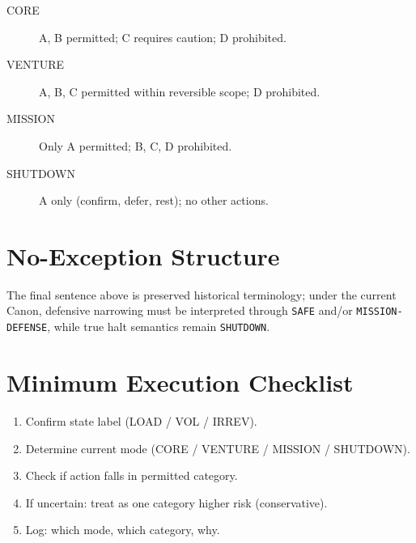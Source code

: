 
\begin{description}
\item[CORE] A, B permitted; C requires caution; D prohibited.
\item[VENTURE] A, B, C permitted within reversible scope;
D prohibited.
\item[MISSION] Only A permitted; B, C, D prohibited.
\item[SHUTDOWN] A only (confirm, defer, rest); no other actions.
\end{description}

\section{No-Exception Structure}
\label{sec:sop-os-no-exception}


\noindent
The final sentence above is preserved historical terminology; under the
current Canon, defensive narrowing must be interpreted through
\texttt{SAFE} and/or \texttt{MISSION-DEFENSE}, while true halt semantics
remain \texttt{SHUTDOWN}.

\section{Minimum Execution Checklist}
\label{sec:sop-os-checklist}

\begin{enumerate}
\item Confirm state label (LOAD / VOL / IRREV).
\item Determine current mode (CORE / VENTURE / MISSION / SHUTDOWN).
\item Check if action falls in permitted category.
\item If uncertain: treat as one category higher risk
(conservative).
\item Log: which mode, which category, why.
\end{enumerate}

